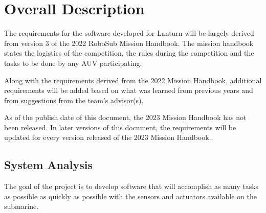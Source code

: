\section{Overall Description}
\label{sec:overall}

The requirements for the software developed for Lanturn will be largely derived
from version 3 of the 2022 RoboSub Mission Handbook. The mission handbook
states the logistics of the competition, the rules during the competition and
the tasks to be done by any AUV participating.  
\par

Along with the requirements derived from the 2022 Mission Handbook, additional
requirements will be added based on what was learned from previous years and
from suggestions from the team’s advisor(s). 
\par

As of the publish date of this document, the 2023 Mission Handbook has not been
released. In later versions of this document, the requirements will be updated
for every version released of the 2023 Mission Handbook.
\par

\subsection{System Analysis}
\label{sec:analysis}

The goal of the project is to develop software that will accomplish as many
tasks as possible as quickly as possible with the sensors and actuators
available on the submarine.

